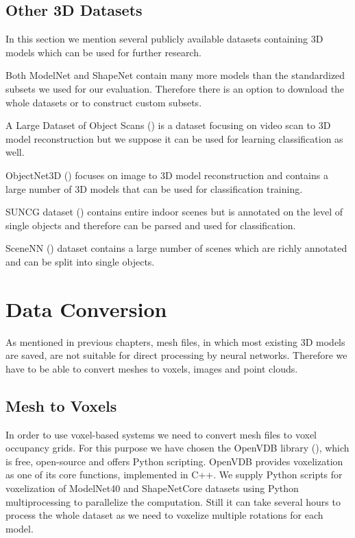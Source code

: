 \subsection{Other 3D Datasets}
In this section we mention several publicly available datasets containing 3D models which can be used for further research. \par
Both ModelNet and ShapeNet contain many more models than the standardized subsets we used for our evaluation. Therefore there is an option to download the whole datasets or to construct custom subsets. \par
A Large Dataset of Object Scans (\cite{choi_large_2016}) is a dataset focusing on video scan to 3D model reconstruction but we suppose it can be used for learning classification as well.  \par
ObjectNet3D (\cite{xiang_objectnet3d:_2016}) focuses on image to 3D model reconstruction and contains a large number of 3D models that can be used for classification training.\par
SUNCG dataset (\cite{song_semantic_2017}) contains entire indoor scenes but is annotated on the level of single objects and therefore can be parsed and used for classification. \par
SceneNN (\cite{hua_scenenn:_2016}) dataset contains a large number of scenes which are richly annotated and can be split into single objects.

\section{Data Conversion}
As mentioned in previous chapters,  mesh files, in which most existing 3D models are saved, are not suitable for direct processing by neural networks. Therefore we have to be able to convert meshes to voxels, images and point clouds.

\subsection{Mesh to Voxels}
In order to use voxel-based systems we need to convert mesh files to voxel occupancy grids. For this purpose we have chosen the OpenVDB library (\cite{museth_openvdb:_2013}), which is free, open-source and offers Python scripting. OpenVDB provides voxelization as one of its core functions, implemented in C++. We supply Python scripts for voxelization of ModelNet40 and ShapeNetCore datasets using Python multiprocessing to parallelize the computation. Still it can take several hours to process the whole dataset as we need to voxelize multiple rotations for each model. 

